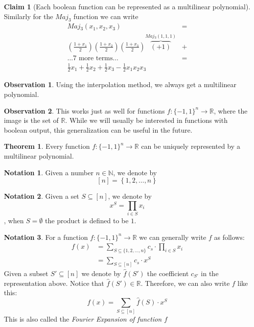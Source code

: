 \documentclass[a4paper,titlepage,twocolumn]{book}
\theoremstyle{definition}
\newtheorem{theorem}{Theorem}[section]
\newtheorem*{notation}{Notation}
\newtheorem*{observation}{Observation}
\newtheorem{claim}{Claim}[section]
\newcommand{\half}{\ensuremath{\frac{1}{2}}}
\newcommand{\fhat}{\ensuremath{\widehat{f}}}
\newcommand{\fhatparam}[1]{\ensuremath{\fhat\left(#1\right)}}
\newcommand{\func}[3]{\ensuremath{#1:#2\rightarrow #3}}
\newcommand{\MO}[1][]{\ensuremath{\{-1,1\}^{#1}}}
\newcommand{\sqbkt}[1][n]{\ensuremath{\left[#1\right]}}
\newcommand{\Reals}{\ensuremath{\mathbb{R}}}
\newcommand{\Naturals}{\ensuremath{\mathbb{N}}}
\begin{document}
\begin{claim} [Each boolean function can be represented as a multilinear polynomial]
	Similarly for the $Maj_3$ function we can write
\[
	\begin{split}
	Maj{}_3\left(x_1,x_2,x_3\right) & = \\ 
	 \left(\frac{1+x_1}{2}\right)\left(\frac{1+x_2}{2}\right)\left(\frac{1+x_3}{2}\right)\overbrace{\left(+1\right)}^{Maj{}_3\left(1,1,1\right)}  & + \\
	 \ldots\text{7 more terms}\ldots & =\\
	 \half x_1 + \half x_2 + \half x_3 - \half x_1 x_2 x_3 &
	\end{split}
\]
\end{claim}

\begin{observation}
	Using the interpolation method, we always get a multilinear polynomial.
\end{observation}
\begin{observation}
	This works just as well for functions \func{f}{\MO[n]}{\Reals}, where the image is the set of \Reals. While we will usually be interested in functions with boolean output, this generalization can be useful in the future.
\end{observation}
\begin{theorem}
	Every function \func{f}{\MO[n]}{\Reals} can be uniquely represented by a multilinear polynomial.
\end{theorem}
\begin{notation}
	Given a number $n\in\Naturals$, we denote by \[\sqbkt=\left\{1,2,\ldots,n\right\}\]
\end{notation}
\begin{notation}
	Given a set $S\subseteq\sqbkt$, we denote by \[x^S = \prod_{i\in S}x_i\], when $S=\emptyset$ the product is defined to be $1$.
\end{notation}
\begin{notation}
	For a function \func{f}{\MO[n]}{\Reals} we can generally write $f$ as follows:	
\[
	\begin{split}
	f(x) & = \sum_{S\subseteq \{1,2,\ldots,n\}}c_s\cdot\prod_{i\in S}{x_i} \\
	& = \sum_{S\subseteq\sqbkt}c_s\cdot x^S 
	\end{split}
\]
	Given a subset $S'\subseteq \sqbkt$ we denote by \fhatparam{S'} the coefficient $c_{S'}$ in the representation above. Notice that \fhat$\left(S'\right) \in \Reals$. Therefore, we can also write $f$ like this:
	\[f(x) = \sum_{S\subseteq\sqbkt}\fhatparam{S}\cdot x^S\]
	This is also called the \emph{Fourier Expansion of function $f$}
	\end{notation}
\end{document}
